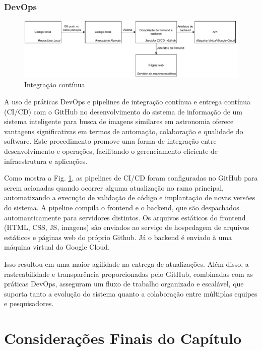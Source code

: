 \subsubsection{DevOps}
\label{sec:si-devops}

\begin{figure}[!ht]
  \centering
  \caption{Integração contínua}
  \label{fig:ci-cd}
  \includegraphics[width=\linewidth]{figures/ci-cd.pdf}
\end{figure}

A uso de práticas DevOps e pipelines de integração contínua e entrega contínua (CI/CD) com o GitHub no desenvolvimento do sistema de informação de um sistema inteligente para busca de imagens similares em astronomia oferece vantagens significativas em termos de automação, colaboração e qualidade do software. Este procedimento promove uma forma de integração entre desenvolvimento e operações, facilitando o gerenciamento eficiente de infraestrutura e aplicações.

Como mostra a Fig. \ref{fig:ci-cd}, as pipelines de CI/CD foram configuradas no GitHub para serem acionadas quando ocorrer alguma atualização no ramo principal, automatizando a execução de validação de código e implantação de novas versões do sistema. A pipeline compila o frontend e o backend, que são despachados automanticamente para servidores distintos. Os arquivos estáticos do frontend (HTML, CSS, JS, imagens) são enviados ao serviço de hospedagem de arquivos estáticos e páginas web do próprio Github. Já o backend é enviado à uma máquina virtual do Google Cloud.

Isso resultou em uma maior agilidade na entrega de atualizações. Além disso, a rastreabilidade e transparência proporcionadas pelo GitHub, combinadas com as práticas DevOps, asseguram um fluxo de trabalho organizado e escalável, que suporta tanto a evolução do sistema quanto a colaboração entre múltiplas equipes e pesquisadores.



\section{Considerações Finais do Capítulo}
\label{sec:conclusao-desenvolvimento}

